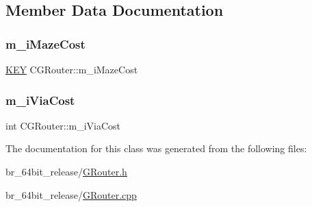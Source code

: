 \subsection{Member Data Documentation}
\mbox{\label{classCGRouter_a86119517e05eaa998f13b7f7bd94c5cf}} 
\subsubsection{\texorpdfstring{m\_iMazeCost}{m\_iMazeCost}}
{\footnotesize\ttfamily \mbox{\hyperlink{res2dmp_8cpp_a8ae9d53f33f46cfcfcb9736e6351452a}{K\+EY}} C\+G\+Router\+::m\+\_\+i\+Maze\+Cost\hspace{0.3cm}{\ttfamily [static]}}

\mbox{\label{classCGRouter_a12b269c0de33d520a32e95a731b0d927}} 
\subsubsection{\texorpdfstring{m\_iViaCost}{m\_iViaCost}}
{\footnotesize\ttfamily int C\+G\+Router\+::m\+\_\+i\+Via\+Cost\hspace{0.3cm}{\ttfamily [static]}}



The documentation for this class was generated from the following files\+:\begin{DoxyCompactItemize}
\item 
br\+\_\+64bit\+\_\+release/\mbox{\hyperlink{GRouter_8h}{G\+Router.\+h}}\item 
br\+\_\+64bit\+\_\+release/\mbox{\hyperlink{GRouter_8cpp}{G\+Router.\+cpp}}\end{DoxyCompactItemize}
